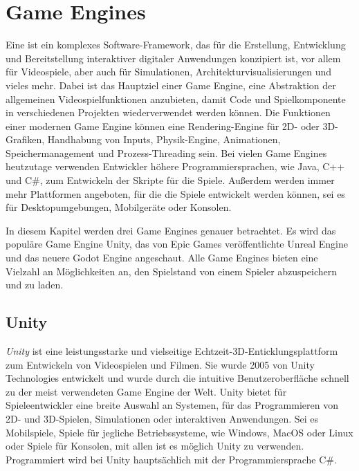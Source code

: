 \chapter{Game Engines}\label{ch:gameengines}
Eine  ist ein komplexes Software-Framework, das für die Erstellung, Entwicklung und Bereitstellung interaktiver digitaler Anwendungen konzipiert ist, vor allem für Videospiele, aber auch für Simulationen, Architekturvisualisierungen und vieles mehr. Dabei ist das Hauptziel einer Game Engine, eine Abstraktion der allgemeinen Videospielfunktionen anzubieten, damit Code und Spielkomponente in verschiedenen Projekten wiederverwendet werden können. Die Funktionen einer modernen Game Engine können eine Rendering-Engine für 2D- oder 3D-Grafiken, Handhabung von Inputs, Physik-Engine, Animationen, Speichermanagement und Prozess-Threading sein. Bei vielen Game Engines heutzutage verwenden Entwickler höhere Programmiersprachen, wie Java, C++ und C\#, zum Entwickeln der Skripte für die Spiele. Außerdem werden immer mehr Plattformen angeboten, für die die Spiele entwickelt werden können, sei es für Desktopumgebungen, Mobilgeräte oder Konsolen.\cite{andrade2015game}

In diesem Kapitel werden drei Game Engines genauer betrachtet. Es wird das populäre Game Engine Unity, das von Epic Games veröffentlichte Unreal Engine und das neuere Godot Engine angeschaut. Alle Game Engines bieten eine Vielzahl an Möglichkeiten an, den Spielstand von einem Spieler abzuspeichern und zu laden.


\section{Unity}
\textit{Unity} ist eine leistungsstarke und vielseitige Echtzeit-3D-Enticklungsplattform zum Entwickeln von Videospielen und Filmen. Sie wurde 2005 von Unity Technologies entwickelt und wurde durch die intuitive Benutzeroberfläche schnell zu der meist verwendeten Game Engine der Welt. Unity bietet für Spieleentwickler eine breite Auswahl an Systemen, für das Programmieren von 2D- und 3D-Spielen, Simulationen oder interaktiven Anwendungen. Sei es Mobilspiele, Spiele für jegliche Betriebssysteme, wie Windows, MacOS oder Linux oder Spiele für Konsolen, mit allen ist es möglich Unity zu verwenden. Programmiert wird bei Unity hauptsächlich mit der Programmiersprache C\#.\cite{unityUnityEngine}\cite{vsmid2017comparison}

